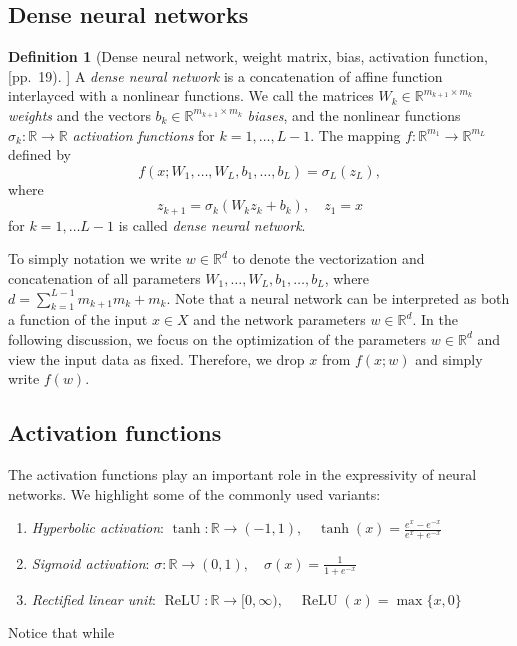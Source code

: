 \documentclass[12pt]{article}
\theoremstyle{definition}
\newtheorem{definition}[definition]{Definition}
\numberwithin{equation}{section}
\newcommand{\R}{\mathbb{R}}
\DeclareMathOperator{\ReLU}{ReLU}
\begin{document}
\subsection{Dense neural networks}
\begin{definition}[Dense neural network, weight matrix, bias, activation function, \protect[pp.~19]{\cite{aggarwalNeuralNetworksDeep2018}}]
  A \emph{dense neural network} is a concatenation of affine function interlayced with a nonlinear functions. We call the matrices $W_k \in \R^{m_{k+1} \times m_k}$ \emph{weights} and the vectors $b_k \in \R^{m_{k+1} \times m_k}$ \emph{biases}, and the nonlinear functions $\sigma_k : \R \rightarrow \R$ \emph{activation functions} for $k = 1, \dots, L-1$. The mapping $f : \R^{m_1} \rightarrow \R^{m_L}$ defined by
  \begin{equation*}
      f(x;W_1,\dots,W_L,b_1,\dots,b_L) = \sigma_L(z_L),
  \end{equation*}
  where 
  \begin{equation*}
    z_{k+1} = \sigma_k(W_k z_k + b_k), \quad z_1 = x
  \end{equation*}
  for $k = 1, \dots L-1$ is called \emph{dense neural network}.
\end{definition}
To simply notation we write $w \in \R^d$ to denote the vectorization and concatenation of all parameters $W_1, \dots, W_L, b_1, \dots, b_L$, where $d = \sum_{k=1}^{L-1} m_{k+1}m_k + m_k$.
Note that a neural network can be interpreted as both a function of the input $x \in X$ and the network parameters $w \in \R^d$. In the following discussion, we focus on the optimization of the parameters $w \in \R^d$ and view the input data as fixed. Therefore, we drop $x$ from $f(x;w)$ and simply write $f(w)$.
\subsection{Activation functions}
The activation functions play an important role in the expressivity of neural networks. We highlight some of the commonly used variants:
\begin{enumerate}
  \item \emph{Hyperbolic activation}: $\tanh : \R \rightarrow (-1,1), \quad \tanh(x) = \frac{e^x - e^{-x}}{e^x + e^{-x}}$
  \item \emph{Sigmoid activation}: $\sigma : \R \rightarrow (0,1), \quad \sigma(x) = \frac{1}{1+e^{-x}}$
  \item \emph{Rectified linear unit}: $\ReLU : \R \rightarrow [0,\infty), \quad \ReLU(x) = \max\{x,0\}$
\end{enumerate}
Notice that while 
\end{document}
